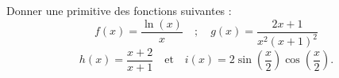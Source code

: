 \documentclass[a4paper, 11pt,openany]{book}%
\newtheorem[L]{thm}{Théorème}[section]
\newtheorem[M]{propo}[thm]{Proposition}
\newtheorem[M]{prop}[thm]{Propriété}
\newtheorem[M]{coro}[thm]{Corollaire}
\newtheorem[M]{lem}[thm]{Lemme}
\newtheorem[M,bodystyle=]{defi}[thm]{Définition}
\newtheorem[M,bodystyle=]{remark}[thm]{Remarque}
\newtheorem[M,bodystyle=]{met}[thm]{Méthode}
\newtheorem[M,bodystyle=]{ret}[thm]{A retenir}
\newtheorem[M,bodystyle=]{idee}[thm]{Idée}
\newtheorem[style=S,underline=false,bodystyle=]{exem}[thm]{Exemple}
\newtheorem[S,underline=false,bodystyle=]{exo}[thm]{Exercice}
\newtheorem[S,underline=false,bodystyle=]{appli}[thm]{Application}
\newtheorem[S,underline=false,bodystyle=]{sol}[thm]{Solution}
\newtheorem[S,underline=false,bodystyle=]{hypo}[thm]{Hypothesis}
\newtheorem[S,underline=false,bodystyle=]{nota}[thm]{Notation}
\begin{document}
\begin{exo}

Donner une primitive des fonctions suivantes :
\[ f(x) = \frac{\ln(x)}{x} \quad ; \quad  g(x) = \frac{2x + 1}{x^2(x + 1)^2}\]
\[ h(x) = \frac{x+2}{x+1} \quad \text{et} \quad i(x) = 2 \sin \left( \frac{x}{2} \right) \cos \left( \frac{x}{2} \right).\]

\end{exo}


\begin{sol}

%
\end{sol}
\end{document}
